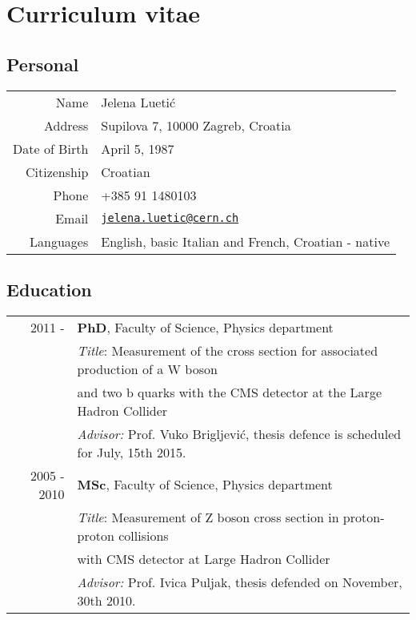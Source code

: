 \chapter*{Curriculum vitae}
\section*{Personal}


  \begin{tabular}{r|l}
    Name & Jelena Luetić \\
	Address & Supilova 7, 10000 Zagreb, Croatia \\   
    Date of Birth & April 5, 1987 \\
    Citizenship & Croatian \\
    Phone & +385 91 1480103 \\
    Email & \href{mailto:jelena.luetic@cern.ch}{\tt jelena.luetic@cern.ch} \\
    Languages & English, basic Italian and French, Croatian - native \\
  \end{tabular}



\section*{Education}

\begin{table}[h!]
 \centering
\begin{tabular}{r | l}
2011 - & \textbf{PhD}, Faculty of Science, Physics department \\ & \textit{Title}: 
Measurement of the cross section for associated production of a W boson \\ & and two b quarks with the CMS detector at the Large Hadron Collider \\ &  \textit{Advisor:} Prof. Vuko Brigljević, thesis defence is scheduled for July, 15th 2015. \\[5pt] 
2005 - 2010 & \textbf{MSc}, Faculty of Science, Physics department \\  & \textit{Title}: Measurement of Z boson cross section in proton-proton collisions \\ & with CMS detector at Large Hadron Collider \\ &  \textit{Advisor:} Prof. Ivica Puljak, thesis defended on November, 30th 2010. \\ 
\end{tabular}
\end{table}



